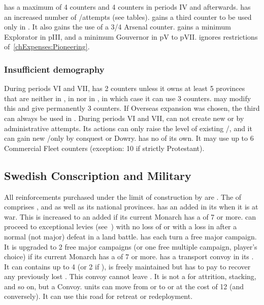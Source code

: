 \bparag \SUE has a maximum of 4 \TP counters and 4 \COL counters in
periods IV and afterwards.
\bparag \SUE has an increased number of \TP/\COL attempts (see tables).
\bparag \SUE gains a third \ARMY counter to be used only in \ROTW.
It also gains the use of a 3/4 Arsenal counter.
\bparag \SUE gains a minimum Explorator in pIII, and a minimum Gouvernor
in pV to pVII.
\bparag \SUE ignores restrictions of~\ref{chExpenses:Pioneering}.


\subsubsection{Insufficient demography}
\aparag During periods VI and VII, \SUE has 2 \ARMY counters unless it
owns at least 5 provinces that are neither in , in
 nor in , in which case it can use 3
\ARMY counters. 
\bparag {} may modify this and give \SUE
permanently 3 \ARMY counters.
\bparag If Overseas expansion was chosen, the third \ARMY can always be
used in \ROTW.
\aparag During periods VI and VII, \SUE can not create new \COL or \TP by
administrative attempts. Its actions can only raise the level of
existing \COL/\TP, and it can gain new \TP/\COL only by conquest or
Dowry.
\aparag \SUE has no \CTZ of its own. It may use up to 6 Commercial
Fleet counters (exception: 10 if strictly Protestant).

\subsection{Swedish Conscription and Military}
\label{chSpecific:Sweden:Conscription}
\aparag All reinforcements purchased under the limit of construction by
\SUE are .
\aparag The  of \SUE comprises
,  and  as well as
its national provinces.
\aparag \SUE has an added \ARMY\facemoins in its 
when it is at war. This is increased to an added \ARMY\faceplus if its
current Monarch has a \MIL of 7 or more.
\aparag \SUE can proceed to exceptional levies
(see~) with no loss of \STAB
or with a loss in \STAB after a normal (not major) defeat in a land battle.
\aparag \SUE has each turn a free major campaign. It is upgraded to 
2 free major campaigns (or one free multiple campaign, player's choice) 
if its current Monarch has a \MIL of 7 or more.
 \SUE has a transport convoy in its
. It can contains up to 4 \NTD (or 2 \NTD if
\facemoins), is freely maintained but \SUE has to pay to recover any
previously lost \NTD. This convoy cannot leave . It is
not a \FLEET for attrition, stacking, and so on, but a Convoy.
 \SUE units can move from
 or  to  or
 at the cost of 12 \MP (and conversely).  It can
use this road for retreat or redeployment.


